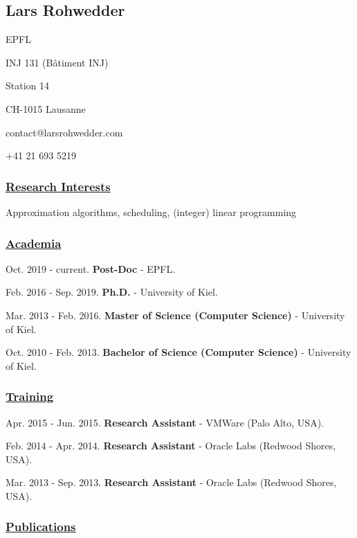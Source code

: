\documentclass{article}
\begin{document}
  \subsection*{Lars Rohwedder}
  
    \noindent EPFL
  
    \noindent INJ 131 (Bâtiment INJ)
  
    \noindent Station 14
  
    \noindent CH-1015 Lausanne
  
  \noindent contact@larsrohwedder.com

  \noindent +41 21 693 5219

  \subsubsection*{\underline{Research Interests}}
    Approximation algorithms, scheduling, (integer) linear programming

  \subsubsection*{\underline{Academia}}
  
    \noindent
    Oct. 2019 - current.\textbf{ Post-Doc }- EPFL. \medskip

  
    \noindent
    Feb. 2016 - Sep. 2019.\textbf{ Ph.D. }- University of Kiel. \medskip

  
    \noindent
    Mar. 2013 - Feb. 2016.\textbf{ Master of Science (Computer Science) }- University of Kiel. \medskip

  
    \noindent
    Oct. 2010 - Feb. 2013.\textbf{ Bachelor of Science (Computer Science) }- University of Kiel. \medskip

  

  \subsubsection*{\underline{Training}}
  
    \noindent
    Apr. 2015 - Jun. 2015.\textbf{ Research Assistant }- VMWare (Palo Alto, USA). \medskip

  
    \noindent
    Feb. 2014 - Apr. 2014.\textbf{ Research Assistant }- Oracle Labs (Redwood Shores, USA). \medskip

  
    \noindent
    Mar. 2013 - Sep. 2013.\textbf{ Research Assistant }- Oracle Labs (Redwood Shores, USA). \medskip

  

  \subsubsection*{\underline{Publications}}
  
\end{document}
